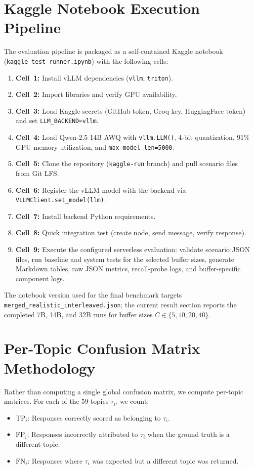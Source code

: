 \documentclass[pdflatex,sn-mathphys-num]{sn-jnl}%
\theoremstyle{thmstyleone}%
\theoremstyle{thmstyletwo}%
\theoremstyle{thmstylethree}%
\begin{document}
\begin{appendices}
\section{Kaggle Notebook Execution Pipeline}\label{secA2}

The evaluation pipeline is packaged as a self-contained Kaggle notebook (\texttt{kaggle\_test\_runner.ipynb}) with the following cells:

\begin{enumerate}
    \item \textbf{Cell~1:} Install vLLM dependencies (\texttt{vllm}, \texttt{triton}).
    \item \textbf{Cell~2:} Import libraries and verify GPU availability.
    \item \textbf{Cell~3:} Load Kaggle secrets (GitHub token, Groq key, HuggingFace token) and set \texttt{LLM\_BACKEND=vllm}.
    \item \textbf{Cell~4:} Load Qwen-2.5 14B AWQ with \texttt{vllm.LLM()}, 4-bit quantization, 91\% GPU memory utilization, and \texttt{max\_model\_len=5000}.
    \item \textbf{Cell~5:} Clone the repository (\texttt{kaggle-run} branch) and pull scenario files from Git LFS.
    \item \textbf{Cell~6:} Register the vLLM model with the backend via \texttt{VLLMClient.set\_model(llm)}.
    \item \textbf{Cell~7:} Install backend Python requirements.
    \item \textbf{Cell~8:} Quick integration test (create node, send message, verify response).
    \item \textbf{Cell~9:} Execute the configured serverless evaluation: validate scenario JSON files, run baseline and system tests for the selected buffer sizes, generate Markdown tables, raw JSON metrics, recall-probe logs, and buffer-specific component logs.
\end{enumerate}

The notebook version used for the final benchmark targets \texttt{merged\_realistic\_interleaved.json}; the current result section reports the completed 7B, 14B, and 32B runs for buffer sizes $C \in \{5,10,20,40\}$.

\section{Per-Topic Confusion Matrix Methodology}\label{secA3}

Rather than computing a single global confusion matrix, we compute per-topic matrices. For each of the 59 topics $\tau_i$, we count:
\begin{itemize}
    \item $\text{TP}_i$: Responses correctly scored as belonging to $\tau_i$.
    \item $\text{FP}_i$: Responses incorrectly attributed to $\tau_i$ when the ground truth is a different topic.
    \item $\text{FN}_i$: Responses where $\tau_i$ was expected but a different topic was returned.
\end{itemize}


\end{appendices}
\end{document}
